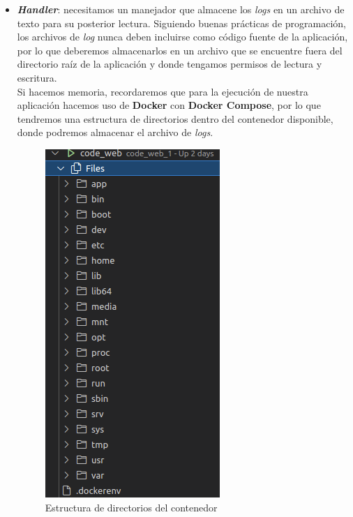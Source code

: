 \begin{enumerate}
\begin{itemize}
                \item \textbf{\textit{Handler}}: necesitamos un manejador que almacene los
                \textit{logs} en un archivo de texto para su posterior lectura. Siguiendo
                buenas prácticas de programación, los archivos de \textit{log} nunca deben
                incluirse como código fuente de la aplicación, por lo que deberemos
                almacenarlos en un archivo que se encuentre fuera del directorio raíz de la
                aplicación y donde tengamos permisos de lectura y escritura. \\
                
                Si hacemos memoria, recordaremos que para la ejecución de nuestra
                aplicación hacemos uso de \textbf{Docker} con \textbf{Docker Compose}, por
                lo que tendremos una estructura de directorios dentro del contenedor
                disponible, donde podremos almacenar el archivo de \textit{logs}. 
                
                    \begin{figure}[H]
                        \centering
                        \includegraphics[scale=0.35]{imagenes/docker-structure.png}
                        \caption{Estructura de directorios del contenedor}
                        \label{fig:docker-structure}
                    \end{figure}
                

\end{itemize}
\end{enumerate}
